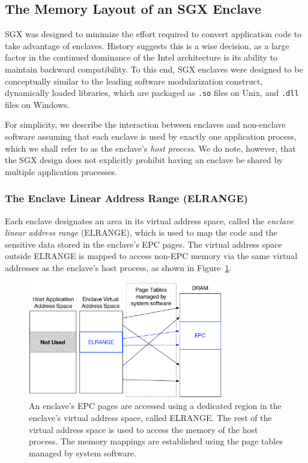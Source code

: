 \subsection{The Memory Layout of an SGX Enclave}
\label{sec:sgx_enclave_layout}

SGX was designed to minimize the effort required to convert application code to
take advantage of enclaves. History suggests this is a wise decision, as a
large factor in the continued dominance of the Intel architecture is its
ability to maintain backward compatibility. To this end, SGX enclaves were
designed to be conceptually similar to the leading software modularization
construct, dynamically loaded libraries, which are packaged as \texttt{.so}
files on Unix, and \texttt{.dll} files on Windows.

For simplicity, we describe the interaction between enclaves and non-enclave
software assuming that each enclave is used by exactly one application process,
which we shall refer to as the enclave's \textit{host process}. We do note,
however, that the SGX design does not explicitly prohibit having an enclave be
shared by multiple application processes.


\subsubsection{The Enclave Linear Address Range (ELRANGE)}
\label{sec:sgx_elrange}


Each enclave designates an area in its virtual address space, called the
\textit{enclave linear address range} (ELRANGE), which is used to map the code
and the sensitive data stored in the enclave's EPC pages. The virtual address
space outside ELRANGE is mapped to access non-EPC memory via the same virtual
addresses as the enclave's host process, as shown in
Figure~\ref{fig:sgx_elrange}.

\begin{figure}[hbt]
  \centering
  \includegraphics[width=85mm]{figures/sgx_elrange.pdf}
  \caption{
    An enclave's EPC pages are accessed using a dedicated region in the
    enclave's virtual address space, called ELRANGE. The rest of the virtual
    address space is used to access the memory of the host process. The memory
    mappings are established using the page tables managed by system software.
  }
  \label{fig:sgx_elrange}
\end{figure}

